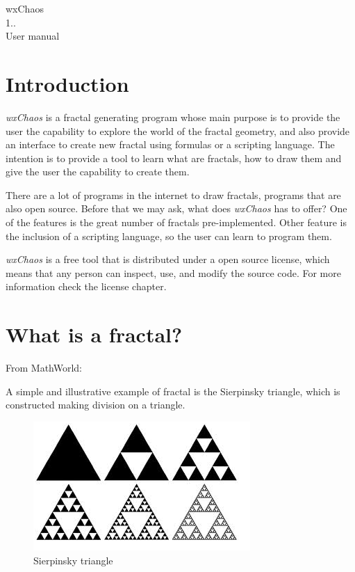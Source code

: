 \documentclass[oneside]{book}
\begin{document}
\begin{titlepage}
\vspace*{7cm}
\begin{center}
{\Huge wxChaos \\[1ex]\large 1.. }\\
\vspace*{1cm}
{\large User manual}\\
\vspace*{0.5cm}
\end{center}
\end{titlepage}
\tableofcontents
{}
\chapter{Introduction}
\textit{wxChaos} is a fractal generating program whose main purpose is to provide the user the capability to explore the world of the fractal geometry, and also provide an interface to create new fractal using formulas or a scripting language. The intention is to provide a tool to learn what are fractals, how to draw them and give the user the capability to create them.

There are a lot of programs in the internet to draw fractals, programs that are also open source. Before that we may ask, what does \textit{wxChaos} has to offer? One of the features is the great number of fractals pre-implemented. Other feature is the inclusion of a scripting language, so the user can learn to program them.

\textit{wxChaos} is a free tool that is distributed under a open source license, which means that any person can inspect, use, and modify the source code. For more information check the license chapter.

\chapter{What is a fractal?}
From MathWorld:

A simple and illustrative example of fractal is the Sierpinsky triangle, which is constructed making division on a triangle.
\begin{figure}[h!]
	\centering
	\includegraphics[scale=0.7]{img/triangle.png}
	\caption{Sierpinsky triangle}
	\label{triangle}
\end{figure}
\end{document}
